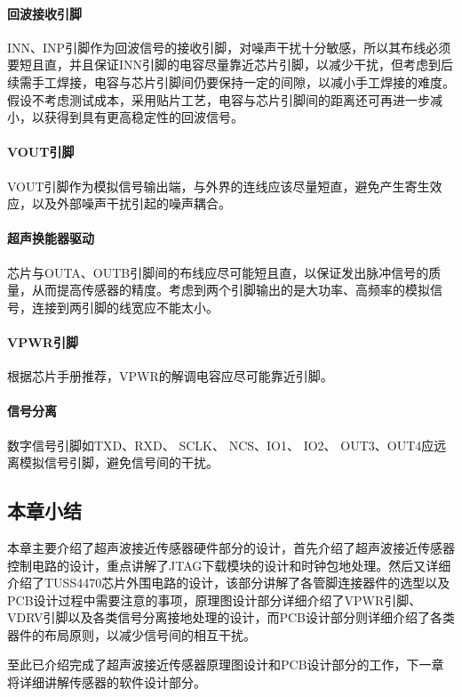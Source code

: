 \paragraph{回波接收引脚}
INN、INP引脚作为回波信号的接收引脚，对噪声干扰十分敏感，所以其布线必须要短且直，并且保证INN引脚的电容尽量靠近芯片引脚，以减少干扰，但考虑到后续需手工焊接，电容与芯片引脚间仍要保持一定的间隙，以减小手工焊接的难度。假设不考虑测试成本，采用贴片工艺，电容与芯片引脚间的距离还可再进一步减小，以获得到具有更高稳定性的回波信号。
\paragraph{VOUT引脚}
VOUT引脚作为模拟信号输出端，与外界的连线应该尽量短直，避免产生寄生效应，以及外部噪声干扰引起的噪声耦合。\par
\paragraph{超声换能器驱动}
芯片与OUTA、OUTB引脚间的布线应尽可能短且直，以保证发出脉冲信号的质量，从而提高传感器的精度。考虑到两个引脚输出的是大功率、高频率的模拟信号，连接到两引脚的线宽应不能太小。\par
\paragraph{VPWR引脚}
根据芯片手册推荐，VPWR的解调电容应尽可能靠近引脚。\par
\paragraph{信号分离}
数字信号引脚如TXD、RXD、 SCLK、 NCS、IO1、 IO2、 OUT3、OUT4应远离模拟信号引脚，避免信号间的干扰。\par
\subsection{本章小结}
本章主要介绍了超声波接近传感器硬件部分的设计，首先介绍了超声波接近传感器控制电路的设计，重点讲解了JTAG下载模块的设计和时钟包地处理。然后又详细介绍了TUSS4470芯片外围电路的设计，该部分讲解了各管脚连接器件的选型以及PCB设计过程中需要注意的事项，原理图设计部分详细介绍了VPWR引脚、VDRV引脚以及各类信号分离接地处理的设计，而PCB设计部分则详细介绍了各类器件的布局原则，以减少信号间的相互干扰。\par
至此已介绍完成了超声波接近传感器原理图设计和PCB设计部分的工作，下一章将详细讲解传感器的软件设计部分。




